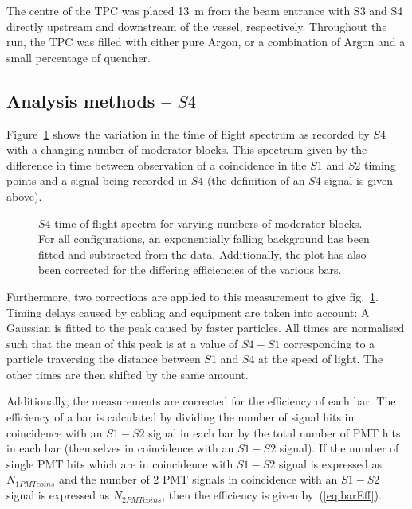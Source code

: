     The centre of the TPC was placed 13~m from the beam entrance with S3 and S4 directly upstream and downstream of the vessel, respectively.
    Throughout the run, the TPC was filled with either pure Argon, or a combination of Argon and a small percentage of quencher.
    
	\subsection{Analysis methods -- $S4$}

	Figure~\ref{fig:s4tof} shows the variation in the time of flight spectrum as recorded by $S4$ with a changing number of moderator blocks. 
	This spectrum given by the difference in time between observation of a coincidence in the $S1$ and $S2$ timing points and a signal being recorded in $S4$ (the definition of an $S4$ signal is given above).
	
	\begin{figure}[h]
		\begin{adjustbox}{max totalsize={.8\textwidth}{.7\textheight},center}
			
		\end{adjustbox}
		\caption{$S4$ time-of-flight spectra for varying numbers of moderator blocks. For all configurations, an exponentially falling background has been fitted and subtracted from the data. Additionally, the plot has also been corrected for the differing efficiencies of the various bars.}
		\label{fig:s4tof}	
	\end{figure}

	Furthermore, two corrections are applied to this measurement to give fig.~\ref{fig:s4tof}. 
	Timing delays caused by cabling and equipment are taken into account:
	A Gaussian is fitted to the peak caused by faster particles.
	All times are normalised such that the mean of this peak is at a value of $S4 - S1$ corresponding to a particle traversing the distance between $S1$ and $S4$ at the speed of light. 
	The other times are then shifted by the same amount.
	
	Additionally, the measurements are corrected for the efficiency of each bar. 
	The efficiency of a bar is calculated by dividing the number of signal hits in coincidence with an $S1-S2$ signal in each bar by the total number of PMT hits in each bar (themselves in coincidence with an $S1-S2$ signal). 
	If the number of single PMT hits which are in coincidence with $S1-S2$ signal is expressed as $N_{1PMTcoins}$ and the number of 2 PMT signals in coincidence with an $S1-S2$ signal is expressed as $N_{2PMTcoins}$, then the efficiency is given by~(\ref{eq:barEff}).
	
